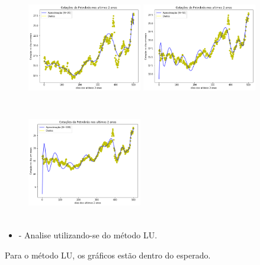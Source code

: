 \documentclass{article}
\begin{document}
\begin{figure}[!htb]
\includegraphics [width=5cm,height=5cm]{Gauss/G20.png}
\includegraphics [width=5cm,height=5cm]{Gauss/G50.png}
\includegraphics [width=5cm,height=5cm]{Gauss/G100.png}
\end{figure}


\newpage

\begin{itemize}
\item - Analise utilizando-se do método LU.
\end{itemize}

\text Para o método LU, os gráficos estão dentro do esperado.
\end{document}
